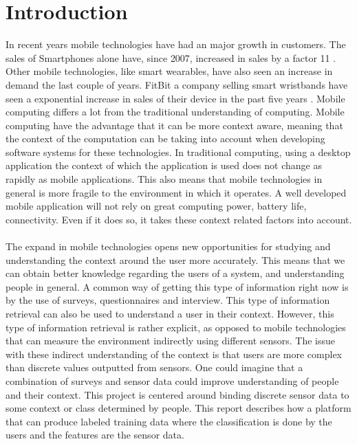 \chapter{Introduction}
\label{cha:introduction}
In recent years mobile technologies have had an major growth in customers. The sales of Smartphones alone have, since 2007, increased in sales by a factor 11 \parencite{statsia_smartphones}. Other mobile technologies, like smart wearables, have also seen an increase in demand the last couple of years. FitBit a company selling smart wristbands have seen a exponential increase in sales of their device in the past five years \parencite{statsia_fitbit}. Mobile computing  differs a lot from the traditional understanding of computing. Mobile computing have the advantage that it can be more context aware, meaning that the context of the computation can be taking into account when developing software systems for these technologies. In traditional computing, using a desktop application the context of which the application is used does not change as rapidly as mobile applications. This also means that mobile technologies in general is more fragile to the environment in which it operates. A well developed mobile application will not rely on great computing power, battery life, connectivity. Even if it does so, it takes these context related factors into account.
\\\\
The expand in mobile technologies opens new opportunities for studying and understanding the context around the user more accurately. This means that we can obtain better knowledge regarding the users of a system, and understanding people in general. A common way of getting this type of information right now is by the use of surveys, questionnaires and interview. This type of information retrieval can also be used to understand a user in their context. However, this type of information retrieval is rather explicit, as opposed to mobile technologies that can measure the environment indirectly using different sensors. The issue with these indirect understanding of the context is that users are more complex than discrete values outputted from sensors. One could imagine that a combination of surveys and sensor data could improve understanding of people and their context. This project is centered around binding discrete sensor data to some context or class determined by people. This report describes how a platform that can produce labeled training data where the classification is done by the users and the features are the sensor data. 
